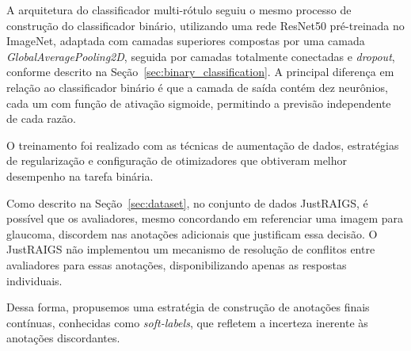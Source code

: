 \documentclass[12pt]{article}
\begin{document}
A arquitetura do classificador multi-rótulo seguiu o mesmo processo de construção do classificador binário, utilizando uma rede ResNet50 pré-treinada no ImageNet, adaptada com camadas superiores compostas por uma camada \emph{GlobalAveragePooling2D}, seguida por camadas totalmente conectadas e \emph{dropout}, conforme descrito na Seção~\ref{sec:binary_classification}. A principal diferença em relação ao classificador binário é que a camada de saída contém dez neurônios, cada um com função de ativação sigmoide, permitindo a previsão independente de cada razão.

O treinamento foi realizado com as técnicas de aumentação de dados, estratégias de regularização e configuração de otimizadores que obtiveram melhor desempenho na tarefa binária.

Como descrito na Seção~\ref{sec:dataset}, no conjunto de dados JustRAIGS, é possível que os avaliadores, mesmo concordando em referenciar uma imagem para glaucoma, discordem nas anotações adicionais que justificam essa decisão. O JustRAIGS não implementou um mecanismo de resolução de conflitos entre avaliadores para essas anotações, disponibilizando apenas as respostas individuais.

Dessa forma, propusemos uma estratégia de construção de anotações finais contínuas, conhecidas como \emph{soft-labels}, que refletem a incerteza inerente às anotações discordantes.
\end{document}
